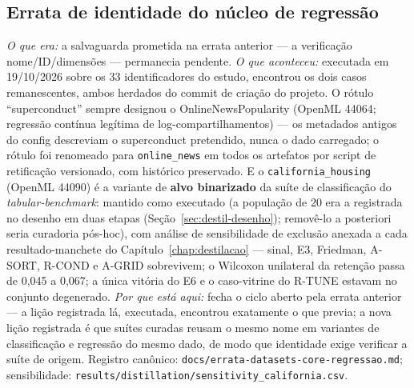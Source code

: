 \subsection{Errata de identidade do núcleo de regressão}
\emph{O que era:} a salvaguarda prometida na errata anterior --- a
verificação nome\slash ID\slash dimensões ---
permanecia pendente. \emph{O que aconteceu:} executada em 19/10/2026
sobre os 33 identificadores do estudo, encontrou os dois casos
remanescentes, ambos herdados do commit de criação do projeto. O
rótulo ``superconduct'' sempre designou o OnlineNewsPopularity
(OpenML 44064; regressão contínua legítima de log-compartilhamentos)
--- os metadados antigos do config descreviam o superconduct
pretendido, nunca o dado carregado; o rótulo foi renomeado para
\texttt{online\_news} em todos os artefatos por script de retificação
versionado, com histórico preservado. E o \texttt{california\_\allowbreak housing}
(OpenML 44090) é a variante de \textbf{alvo binarizado} da suíte de
classificação do \emph{tabular-benchmark}: mantido como executado (a
população de 20 era a registrada no desenho em duas etapas
(Seção~\ref{sec:destil-desenho}); removê-lo a posteriori seria
curadoria pós-hoc), com análise de sensibilidade de exclusão anexada a
cada resultado-manchete do Capítulo~\ref{chap:destilacao} --- sinal,
E3, Friedman, A-SORT, R-COND e A-GRID sobrevivem; o Wilcoxon
unilateral da retenção passa de 0,045 a 0,067; a única vitória do E6 e
o caso-vitrine do R-TUNE estavam no conjunto degenerado. \emph{Por que
está aqui:} fecha o ciclo aberto pela errata anterior --- a lição
registrada lá, executada, encontrou exatamente o que previa; a nova
lição registrada é que suítes curadas reusam o mesmo nome em variantes
de classificação e regressão do mesmo dado, de modo que identidade
exige verificar a suíte de origem. Registro canônico:
\texttt{docs/\allowbreak errata-\allowbreak datasets-\allowbreak core-\allowbreak regressao.\allowbreak md}; sensibilidade:
\texttt{results/\allowbreak distillation/\allowbreak sensitivity\_\allowbreak california.\allowbreak csv}.

